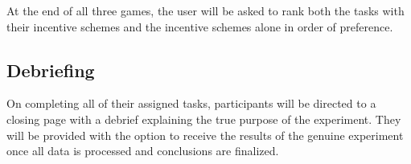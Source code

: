 At the end of all three games, the user will be asked to rank both the tasks with their incentive schemes and the incentive schemes alone in order of preference.

 \subsection{Debriefing}
On completing all of their assigned tasks, participants will be directed to a closing page with a debrief explaining the true purpose of the experiment. They will be provided with the option to receive the results of the genuine experiment once all data is processed and conclusions are finalized.
